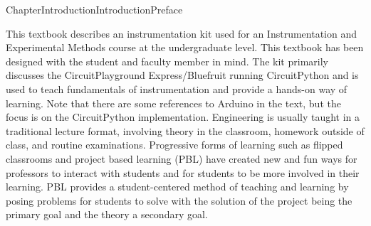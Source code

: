 \documentclass[oneside,10pt,]{book}
\numberwithin{equation}{section}
\begin{document}
\setcounter{tocdepth}{1}
\renewcommand*\contentsname{Contents}
\tableofcontents
\mainmatter
%
%
\typeout{************************************************}
\typeout{************************************************}
%
\begin{chapterptx}{Chapter}{Introduction}{}{Introduction}{}{}{Preface}
\renewcommand*{\chaptername}{Chapter}
\begin{introduction}{}%
This textbook describes an instrumentation kit used for an Instrumentation and Experimental Methods course at the undergraduate level. This textbook has been designed with the student and faculty member in mind. The kit primarily discusses the CircuitPlayground Express\slash{}Bluefruit running CircuitPython and is used to teach fundamentals of instrumentation and provide a hands-on way of learning. Note that there are some references to Arduino in the text, but the focus is on the CircuitPython implementation. Engineering is usually taught in a traditional lecture format, involving theory in the classroom, homework outside of class, and routine examinations. Progressive forms of learning such as flipped classrooms and project based learning (PBL) have created new and fun ways for professors to interact with students and for students to be more involved in their learning. PBL provides a student-centered method of teaching and learning by posing problems for students to solve with the solution of the project being the primary goal and the theory a secondary goal.%
\par

\end{introduction}
\end{chapterptx}
\end{document}

